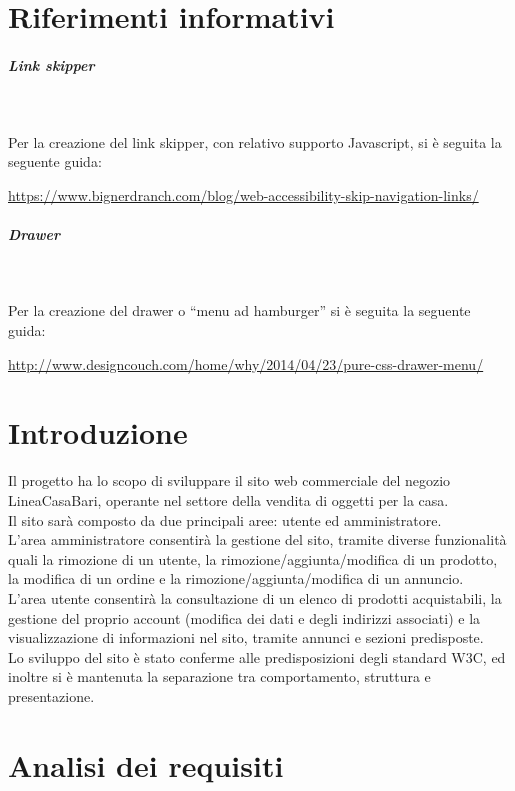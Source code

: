 




\makeFrontPage
\clearpage
\tableofcontents
\clearpage

\section{Riferimenti informativi}
	\subparagraph{Link skipper}~
	
	Per la creazione del link skipper, con relativo supporto Javascript, si è seguita la seguente guida:
	\begin{center}
		\url{https://www.bignerdranch.com/blog/web-accessibility-skip-navigation-links/}
	\end{center}
	
	\subparagraph{Drawer}~
	
	Per la creazione del drawer o ``menu ad hamburger'' si è seguita la seguente guida:
	\begin{center}
		\url{http://www.designcouch.com/home/why/2014/04/23/pure-css-drawer-menu/}
	\end{center}

\section{Introduzione}
Il progetto ha lo scopo di sviluppare il sito web commerciale del negozio LineaCasaBari, operante nel settore della vendita di oggetti per la casa. \\
Il sito sarà composto da due principali aree: utente ed amministratore. \\
L'area amministratore consentirà la gestione del sito, tramite diverse funzionalità quali la rimozione di un utente, la rimozione/aggiunta/modifica di un prodotto, la modifica di un ordine e la rimozione/aggiunta/modifica di un annuncio. \\
L'area utente consentirà la consultazione di un elenco di prodotti acquistabili, la gestione del proprio account (modifica dei dati e degli indirizzi associati) e la visualizzazione di informazioni nel sito, tramite annunci e sezioni predisposte. \\
Lo sviluppo del sito è stato conferme alle predisposizioni degli standard W3C, ed inoltre si è mantenuta la separazione tra comportamento, struttura e presentazione.

\section{Analisi dei requisiti} %
